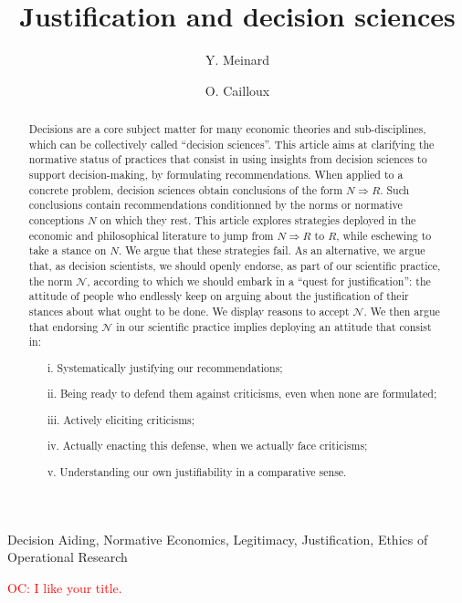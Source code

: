\documentclass[preprint, french, english, 11pt, authoryear]{elsarticle}%
\newcommand{\commentOC}[1]{\textcolor{red}{OC: #1}}
\newcommand{\adv}{\mathscr{N}}
\begin{document}
\title{Justification and decision sciences}

\author[ld]{Y. Meinard}
\author[ld]{O. Cailloux}
\address[ld]{Universit\'e Paris-Dauphine, PSL Research University, CNRS, UMR [7243], LAMSADE, 75016 PARIS, FRANCE}

\begin{abstract}
Decisions are a core subject matter for many economic theories and sub-disciplines, which can be collectively called ``decision sciences''. This article aims at clarifying the normative status of practices that consist in using insights from decision sciences to support decision-making, by formulating recommendations. When applied to a concrete problem, decision sciences obtain conclusions of the form $N ⇒ R$. Such conclusions contain recommendations conditionned by the norms or normative conceptions $N$ on which they rest. This article explores strategies deployed in the economic and philosophical literature to jump from $N ⇒ R$ to $R$, while eschewing to take a stance on $N$. We argue that these strategies fail. As an alternative, we argue that, as decision scientists, we should openly endorse, as part of our scientific practice, the norm $\adv$, according to which we should embark in a ``quest for justification'': the attitude of people who endlessly keep on arguing about the justification of their stances about what ought to be done. We display reasons to accept $\adv$. We then argue that endorsing $\adv$ in our scientific practice implies deploying an attitude that consist in:
\begin{itemize}
\item[i.]	Systematically justifying our recommendations;
\item[ii.]	Being ready to defend them against criticisms, even when none are formulated;
\item[iii.]	Actively eliciting criticisms;
\item[iv.]	Actually enacting this defense, when we actually face criticisms;
\item[v.]	Understanding our own justifiability in a comparative sense.
\end{itemize}
\end{abstract}

\begin{keyword}
Decision Aiding, Normative Economics, Legitimacy, Justification, Ethics of Operational Research
\end{keyword}

\maketitle
\commentOC{I like your title.}
\end{document}
